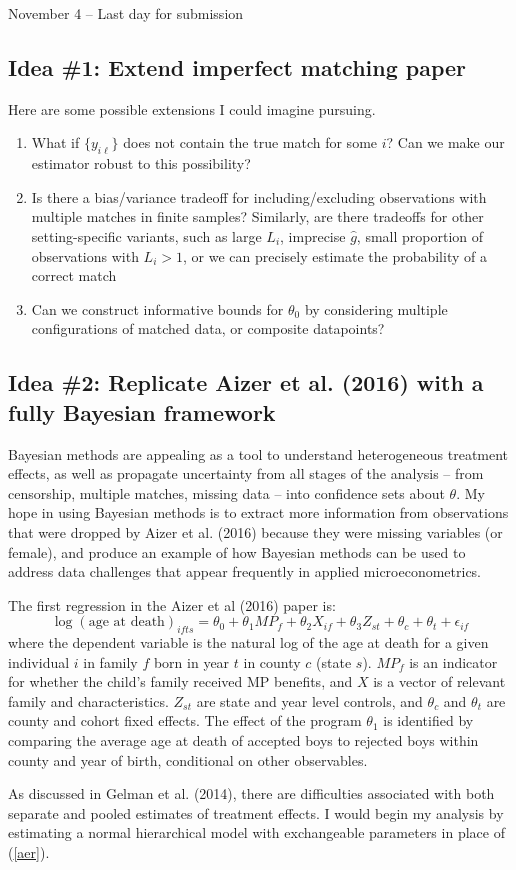 \documentclass[12pt]{article}
\begin{document}
\noindent November 4 -- Last day for submission
\subsection*{Idea \#1: Extend imperfect matching paper}

Here are some possible extensions I could imagine pursuing.  
\begin{enumerate}
    \item What if $\{y_{i\ell}\}$ does not contain the true match for some $i$?  Can we make our estimator robust to this possibility?
    \item Is there a bias/variance tradeoff for including/excluding observations with multiple matches in finite samples? Similarly, are there tradeoffs for other setting-specific variants, such as large $L_i$, imprecise $\hat{g}$, small proportion of observations with $L_i > 1$, or we can precisely estimate the probability of a correct match
    \item Can we construct informative bounds for $\theta_0$ by considering multiple configurations of matched data, or composite datapoints? 
\end{enumerate}





\subsection*{Idea \#2: Replicate  Aizer et al. (2016) with a fully Bayesian framework}

Bayesian methods are appealing as a tool to understand heterogeneous treatment effects, as well as propagate uncertainty from all stages of the analysis -- from censorship, multiple matches, missing data -- into confidence sets about $\theta$.  My hope in using Bayesian methods is to extract more information from observations that were dropped by Aizer et al. (2016) because they were missing variables (or female), and produce an example of how Bayesian methods can be used to address data challenges that appear frequently in applied microeconometrics.  

The first regression in the Aizer et al (2016) paper is:
\begin{equation} \log (\text{age at death})_{ifts} = \theta_0 + \theta_1 MP_f + \theta_2 X_{if} + \theta_3 Z_{st} + \theta_c + \theta_t + \epsilon_{if}
 \label{aer} \end{equation}
where the dependent variable is the natural log of the age at death for a given individual $i$ in family $f$ born in year $t$ in county $c$ (state $s$).  $MP_f$ is an indicator for whether the child's family received MP benefits, and $X$ is a vector of relevant family and characteristics.  $Z_{st}$ are state and year level controls, and $\theta_c$ and $\theta_t$ are county and cohort fixed effects.  The effect of the program $\theta_1$ is identified by comparing the average age at death of accepted boys to rejected boys within county and year of birth, conditional on other observables.

As discussed in Gelman et al. (2014), there are difficulties associated with both separate and pooled estimates of treatment effects. I would begin my analysis by estimating a normal hierarchical model with exchangeable parameters in place of (\ref{aer}). 
\end{document}
